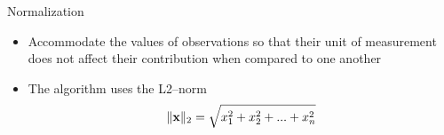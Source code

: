 \begin{frame}{Normalization}
    \begin{itemize}
        \item Accommodate the values of observations so that their unit of measurement does not affect their contribution when compared to one another
        \item The \mlblink algorithm uses the L2--norm 
            \begin{equation} \label{eq:l2-norm}
                \lVert \boldsymbol{\mathbf{x}} \rVert_{2} = \sqrt{x^2_1 + x^2_2 + ... + x^2_n}
            \end{equation}
    \end{itemize}
\end{frame}